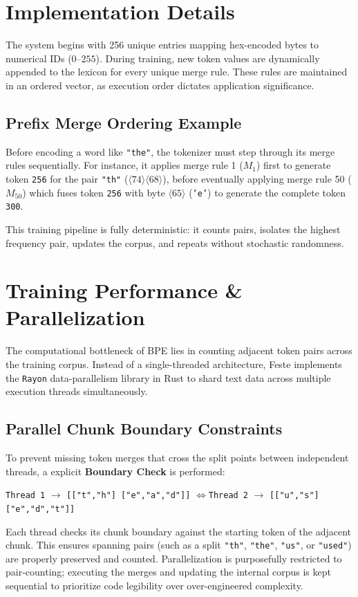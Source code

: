 \documentclass{article}
\begin{document}
\section{Implementation Details}
The system begins with 256 unique entries mapping hex-encoded bytes to numerical IDs ($0$--$255$). During training, new token values are dynamically appended to the lexicon for every unique merge rule. These rules are maintained in an ordered vector, as execution order dictates application significance.

\subsection{Prefix Merge Ordering Example}
Before encoding a word like \texttt{"the"}, the tokenizer must step through its merge rules sequentially. For instance, it applies merge rule 1 ($M_1$) first to generate token \texttt{256} for the pair \texttt{"th"} ($\langle 74 \rangle\langle 68 \rangle$), before eventually applying merge rule 50 ($M_{50}$) which fuses token \texttt{256} with byte $\langle 65 \rangle$ (\texttt{'e'}) to generate the complete token \texttt{300}. 

This training pipeline is fully deterministic: it counts pairs, isolates the highest frequency pair, updates the corpus, and repeats without stochastic randomness.

\section{Training Performance \& Parallelization}
The computational bottleneck of BPE lies in counting adjacent token pairs across the training corpus. Instead of a single-threaded architecture, Feste implements the \texttt{Rayon} data-parallelism library in Rust to shard text data across multiple execution threads simultaneously.

\subsection{Parallel Chunk Boundary Constraints}
To prevent missing token merges that cross the split points between independent threads, a explicit \textbf{Boundary Check} is performed:
\begin{center}
    \texttt{Thread 1} $\rightarrow$ \texttt{[["t","h"] ["e","a","d"]]} \quad$\Longleftrightarrow$\quad \texttt{Thread 2} $\rightarrow$ \texttt{[["u","s"] ["e","d","t"]]}
\end{center}
Each thread checks its chunk boundary against the starting token of the adjacent chunk. This ensures spanning pairs (such as a split \texttt{"th"}, \texttt{"the"}, \texttt{"us"}, or \texttt{"used"}) are properly preserved and counted. Parallelization is purposefully restricted to pair-counting; executing the merges and updating the internal corpus is kept sequential to prioritize code legibility over over-engineered complexity.
\end{document}
